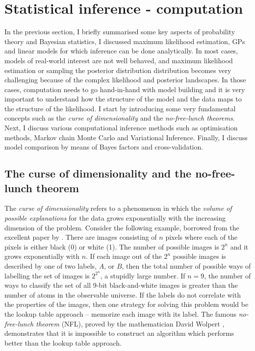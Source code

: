 \documentclass[12pt,dvipsnames]{report}
\begin{document}
\section{Statistical inference - computation}
\label{sec:inference_practice}
In the previous section, I briefly summarised some key aspects of probability theory
and Bayesian statistics, I discussed maximum likelihood estimation, 
GPs and linear models for which inference can be done analytically.
In most cases, models of real-world interest are not well behaved, and maximum
likelihood estimation or sampling the posterior distribution
distribution becomes very challenging because of the complex likelihood and posterior
landscapes. In those cases, computation needs to go hand-in-hand with model building and it
is very important to understand how the structure of the model and the data maps to the
structure of the likelihood.
I start by introducing some very fundamental
concepts such as the \emph{curse of dimensionality} and the \emph{no-free-lunch theorems}.
Next, I discuss various computational inference methods such
as optimisation methods, Markov chain Monte Carlo and Variational Inference.
Finally, I discuss model comparison by means of Bayes factors and cross-validation.

\subsection{The curse of dimensionality and the no-free-lunch theorem}
\label{ssec:nfl_theorems}
The \emph{curse of dimensionality} refers to a phenomenon in which the
\emph{volume of possible explanations} for the data grows exponentially
with the increasing dimension of the problem. Consider the following
example, borrowed from the excellent paper by \citet{arXiv:2104.00008}.
There are images consisting of $n$ pixels where each of the pixels is either
black (0) or white (1). The number of possible images is $2^n$  and it grows
exponentially with $n$. If each image out of the $2^n$ possible images is described by
one of two labels, $A$, or $B$, then the total number of possible ways of
labelling the set of images is $2^{2^n}$, a stupidly large number. If
$n=9$, the number of ways to classify the set of all 9-bit black-and-white
images is greater than the number of atoms in the observable universe. If the
labels do not correlate with the properties of the images, then one strategy for
solving this problem would be the lookup table approach -- memorize each image
with its label. The famous \emph{no-free-lunch theorem} (NFL), proved by the
mathematician David Wolpert \citep{wolpert1996}, demonstrates that it is
impossible to construct an algorithm which performs better than the lookup table
approach.
\end{document}
